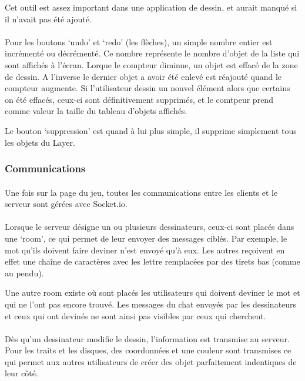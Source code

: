 \documentclass[11pt,a4paper]{article}
\begin{document}
                Cet outil est assez important dans une application de dessin,
                et aurait manqué si il n'avait pas été ajouté.
                \paragraph{}
                Pour les boutons `undo' et `redo' (les flèches), un simple nombre entier est incrémenté ou décrémenté.
                Ce nombre représente le nombre d'objet de la liste qui sont affichés à l'écran.
                Lorque le compteur diminue, un objet est effacé de la zone de dessin.
                A l'inverse le dernier objet a avoir été enlevé est réajouté quand le compteur augmente.
                Si l'utilisateur dessin un nouvel élément alors que certains on été effacés,
                ceux-ci sont définitivement supprimés,
                et le comtpeur prend comme valeur la taille du tableau d'objets affichés.

                Le bouton `suppression' est quand à lui plus simple, il supprime simplement tous les objets du Layer.
            \subsubsection{Communications}
                \paragraph{}
                Une fois sur la page du jeu, toutes les communications entre les clients et le serveur sont gérées avec Socket.io.
                \paragraph{}
                Lorsque le serveur désigne un ou plusieurs dessinateurs, ceux-ci sont placés dans une `room',
                ce qui permet de leur envoyer des messages ciblés.
                Par exemple, le mot qu'ils doivent faire deviner n'est envoyé qu'à eux.
                Les autres reçoivent en effet une chaîne de caractères avec les lettre remplacées par des tirets bas (comme au pendu).

                Une autre room existe où sont placés les utilisateurs qui doivent deviner le mot et qui ne l'ont pas encore trouvé.
                Les messages du chat envoyés par les dessinateurs et ceux qui ont devinés ne sont ainsi pas visibles par ceux qui cherchent.
                \paragraph{}
                Dès qu'un dessinateur modifie le dessin, l'information est transmise au serveur.
                Pour les traits et les disques,
                des coordonnées et une couleur sont transmises ce qui permet aux autres utilisateurs de créer des objet parfaitement indentiques de leur côté.
\end{document}
